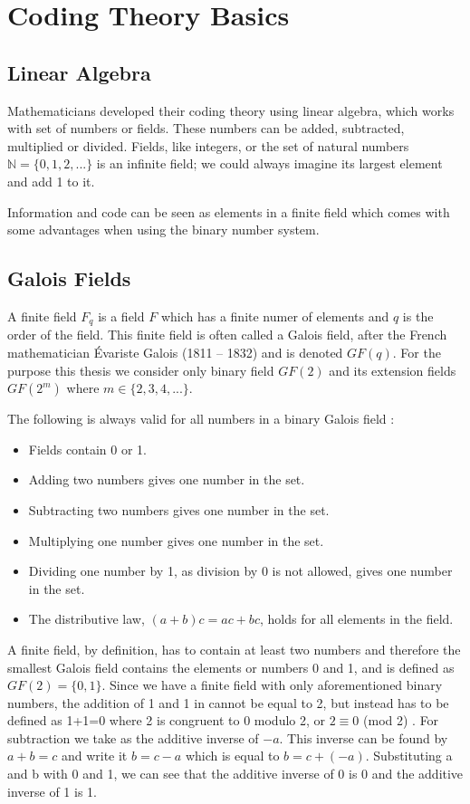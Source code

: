 \documentclass[../main.tex]{subfiles}
\begin{document}
    \chapter{Coding Theory Basics}

    \section{Linear Algebra}
    Mathematicians developed their coding theory using linear algebra, which works with set of numbers or fields. These numbers can be added, subtracted, multiplied or divided. Fields, like integers, or the set of natural numbers $\mathbb{N} = \{0, 1, 2, ...\}$ is an infinite field; we could always imagine its largest element and add 1 to it.

    Information and code can be seen as elements in a finite field which comes with some advantages when using the binary number system.


    \section{Galois Fields}
    A finite field $F_q$ is a field $F$ which has a finite numer of elements and $q$ is the order of the field. This finite field is often called a Galois field, after the French mathematician Évariste Galois (1811 – 1832) and is denoted $GF(q)$. For the purpose this thesis we consider only binary field $GF(2)$ and its extension fields $GF(2^m)$ where $m \in \{2, 3, 4, ...\}$.

    The following is always valid for all numbers in a binary Galois field \autocite{blahut1983theory}:

    \begin{itemize}
        \item Fields contain 0 or 1.
        \item Adding two numbers gives one number in the set.
        \item Subtracting two numbers gives one number in the set.
        \item Multiplying one number gives one number in the set.
        \item Dividing one number by 1, as division by 0 is not allowed, gives one number in the set.
        \item The distributive law, $(a+b)c = ac+bc$, holds for all elements in the field.
    \end{itemize}

    A finite field, by definition, has to contain at least two numbers and therefore the smallest Galois field contains the elements or numbers 0 and 1, and is defined as $GF(2)=\{0,1\}$. Since we have a finite field with only aforementioned binary numbers, the addition of 1 and 1 in  cannot be equal to 2, but instead has to be defined as 1+1=0 where 2 is congruent to 0 modulo 2, or $2 \equiv 0$ (mod 2) \autocite{hill1986first}. For subtraction we take as the additive inverse of $-a$. This inverse can be found by $a+b=c$ and write it $b=c-a$ which is equal to $b=c+(-a)$. Substituting a and b with 0 and 1, we can see that the additive inverse of 0 is 0 and the additive inverse of 1 is 1.
\end{document}
